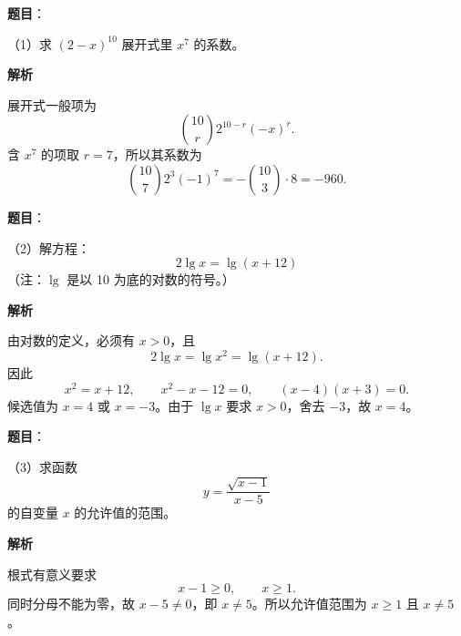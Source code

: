 


\begin{answer}

\textbf{题目}：

（1）求 $(2-x)^{10}$ 展开式里 $x^7$ 的系数。

\textbf{解析}

展开式一般项为
\nopagebreak[4]
\[
\binom{10}{r}2^{10-r}(-x)^r.
\]
含 $x^7$ 的项取 $r=7$，所以其系数为
\nopagebreak[4]
\[
\binom{10}{7}2^3(-1)^7
=-\binom{10}{3}\cdot8
=-960.
\]


\end{answer}
\begin{answer}

\textbf{题目}：

（2）解方程：
\nopagebreak[4]
\[
2\lg x=\lg(x+12)
\]
（注：$\lg$ 是以 10 为底的对数的符号。）

\textbf{解析}

由对数的定义，必须有 $x>0$，且
\nopagebreak[4]
\[
2\lg x=\lg x^2=\lg(x+12).
\]
因此
\nopagebreak[4]
\[
x^2=x+12,
\qquad x^2-x-12=0,
\qquad (x-4)(x+3)=0.
\]
候选值为 $x=4$ 或 $x=-3$。由于 $\lg x$ 要求 $x>0$，舍去 $-3$，故 $x=4$。


\end{answer}
\begin{answer}

\textbf{题目}：

（3）求函数
\nopagebreak[4]
\[
y=\frac{\sqrt{x-1}}{x-5}
\]
的自变量 $x$ 的允许值的范围。

\textbf{解析}

根式有意义要求
\nopagebreak[4]
\[
x-1\ge0,
\qquad x\ge1.
\]
同时分母不能为零，故 $x-5\ne0$，即 $x\ne5$。所以允许值范围为 $x\ge1$ 且 $x\ne5$。


\end{answer}
